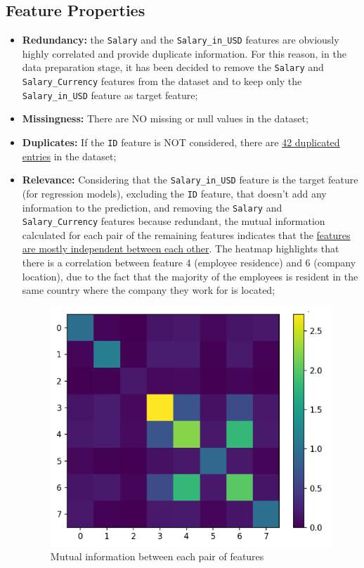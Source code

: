 \documentclass[11pt,a4paper]{article}
\begin{document}
\subsection{Feature Properties} 
\begin{itemize}
\item \textbf{Redundancy:} the \texttt{Salary} and the \texttt{Salary\_in\_USD} features are obviously highly correlated and provide duplicate information. For this reason, in the data preparation stage, it has been decided to remove the \texttt{Salary} and \texttt{Salary\_Currency} features from the dataset and to keep only the \texttt{Salary\_in\_USD} feature as target feature;
\item \textbf{Missingness:} There are NO missing or null values in the dataset;
\item \textbf{Duplicates:} If the \texttt{ID} feature is NOT considered, there are \uline{42 duplicated entries} in the dataset;
\item \textbf{Relevance:} Considering that the \texttt{Salary\_in\_USD} feature is the target feature (for regression models),  excluding the \texttt{ID} feature, that doesn’t add any information to the prediction, and removing the \texttt{Salary} and \texttt{Salary\_Currency} features because redundant, the mutual information calculated for each pair of the remaining features indicates that the \uline{features are mostly independent between each other}. The heatmap highlights that there is a correlation between feature 4 (employee residence) and 6 (company location), due to the fact that the majority of the employees is resident in the same country where the company they work for is located;

\begin{figure}
    \centering
    \includegraphics[width=1\linewidth]{ICS-5110-Fig-01.png}
    \caption{Mutual information between each pair of features}
    \label{fig:Mutual information between each pair of features}
\end{figure}


\end{itemize}
\end{document}
